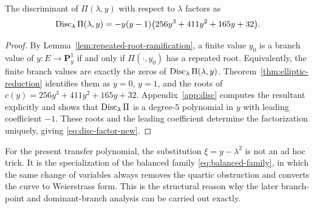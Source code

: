 \begin{corollary}\label{cor:disc-factor}
The discriminant of \(\Pi(\lambda,y)\) with respect to \(\lambda\) factors as
\begin{equation}\label{eq:disc-factor-new}
\operatorname{Disc}_\lambda \Pi(\lambda,y) = -y(y-1)\bigl(256y^3 + 411y^2 + 165y + 32\bigr).
\end{equation}
\end{corollary}

\begin{proof}
By Lemma~\ref{lem:repeated-root-ramification}, a finite value \(y_0\) is a branch value of \(y:E\to \mathbf P^1_y\) if and only if \(\Pi(\cdot,y_0)\) has a repeated root.
Equivalently, the finite branch values are exactly the zeros of \(\operatorname{Disc}_\lambda\Pi(\lambda,y)\).
Theorem~\ref{thm:elliptic-reduction} identifies them as \(y=0\), \(y=1\), and the roots of \(c(y)=256y^3+411y^2+165y+32\).
Appendix~\ref{app:disc} computes the resultant explicitly and shows that \(\operatorname{Disc}_\lambda\Pi\) is a degree-\(5\) polynomial in \(y\) with leading coefficient \(-1\).
These roots and the leading coefficient determine the factorization uniquely, giving \eqref{eq:disc-factor-new}.
\end{proof}

\begin{remark}\label{rem:genus-one-upgrade}
For the present transfer polynomial, the substitution \(\xi=y-\lambda^2\) is not an ad hoc trick.
It is the specialization of the balanced family \eqref{eq:balanced-family}, in which the same change of variables always removes the quartic obstruction and converts the curve to Weierstrass form.
This is the structural reason why the later branch-point and dominant-branch analysis can be carried out exactly.
\end{remark}
